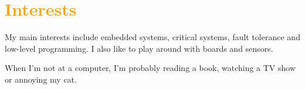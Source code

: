 \documentclass[hidelinks]{article}
\begin{document}
\begin{minipage}[t]{\textwidth - 6.1cm}
    \section*{\textcolor{orange}{Interests}}

        \small My main interests include embedded systems, critical systems, fault tolerance and
        low-level programming. I also like to play around with boards and sensors.

        \smallskip

        \small When I'm not at a computer, I'm probably reading a book, watching a TV show or 
        annoying my cat.

\end{minipage}\hfill
\end{document}
